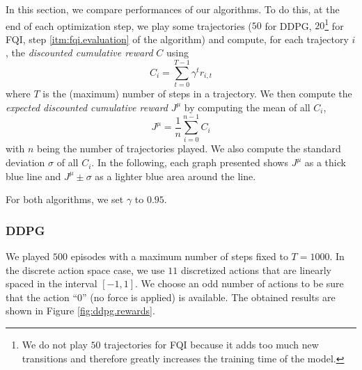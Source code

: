 \documentclass[a4paper, 12pt]{article}
\begin{document}
    In this section, we compare performances of our algorithms. To do this, at the end of each optimization step, we play some trajectories ($50$ for DDPG, $20$\footnote{We do not play $50$ trajectories for FQI because it adds too much new transitions and therefore greatly increases the training time of the model.} for FQI, \cf{} step \ref{itm:fqi.evaluation} of the algorithm) and compute, for each trajectory $i$, the \emph{discounted cumulative reward} $C$ using
    \begin{equation}
        C_i = \sum_{t=0}^{T-1} \gamma^t r_{i, t}
    \end{equation}
    where $T$ is the (maximum) number of steps in a trajectory. We then compute the \emph{expected discounted cumulative reward} $J^{\mu}$ by computing the mean of all $C_i$, \ie{}
    \begin{equation}
        J^{\mu} = \frac{1}{n}\sum_{i=0}^{n-1}C_i
    \end{equation}
    with $n$ being the number of trajectories played. We also compute the standard deviation $\sigma$ of all $C_i$. In the following, each graph presented shows $J^{\mu}$ as a thick blue line and $J^{\mu} \pm \sigma$ as a lighter blue area around the line.
    
    For both algorithms, we set $\gamma$ to $\num{0.95}$.
    
    \subsubsection{DDPG}
    
    We played $\num{500}$ episodes with a maximum number of steps fixed to $T = \num{1000}$. In the discrete action space case, we use $11$ discretized actions that are linearly spaced in the interval $[-1, 1]$. We choose an odd number of actions to be sure that the action \enquote{$0$} (no force is applied) is available. The obtained results are shown in Figure \ref{fig:ddpg.rewards}.
    
\end{document}
